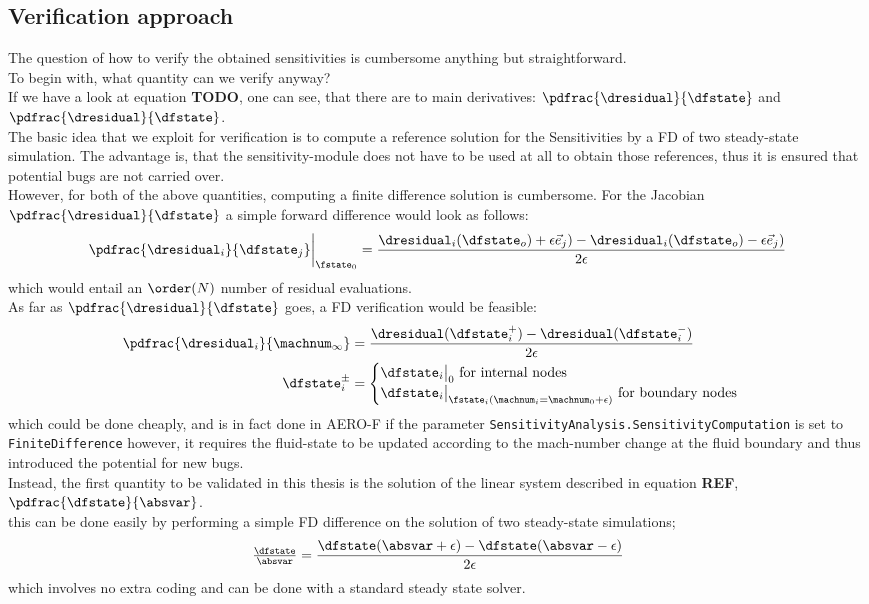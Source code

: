 \documentclass[../main.tex]{subfiles}
\begin{document}
\subsection{Verification approach}\label{sec:verification_approach}
The question of how to verify the obtained sensitivities is cumbersome anything but straightforward.\\
To begin with, what quantity can we verify anyway?\\
If we have a look at equation \textbf{TODO}, one can see, that there are to main derivatives: $\pdfrac{\dresidual}{\dfstate}$ and $\pdfrac{\dresidual}{\dfstate}$.\\
The basic idea that we exploit for verification is to compute a reference solution for the Sensitivities by a \ac{FD} of two steady-state simulation. The advantage is, that the sensitivity-module does not have to be used at all to obtain those references, thus it is ensured that potential bugs are not carried over.\\
However, for both of the above quantities, computing a finite difference solution is cumbersome. For the Jacobian $\pdfrac{\dresidual}{\dfstate}$ a simple forward difference would look as follows:
\begin{align}
\pdfrac{\dresidual_i}{\dfstate_j}\bigg\rvert_{\fstate_0}=\frac{\dresidual_i(\dfstate_o)+\epsilon\vec{e}_j)-\dresidual_i(\dfstate_o)-\epsilon\vec{e}_j)}{2\epsilon}
\end{align}
which would entail an $\order(N)$ number of residual evaluations.\\
As far as $\pdfrac{\dresidual}{\dfstate}$ goes, a \ac{FD} verification would be feasible:
\begin{align}
\pdfrac{\dresidual_i}{\machnum_{\infty}}&=\frac{\dresidual(\dfstate_i^{+})-\dresidual(\dfstate_i^{-})}{2\epsilon} \nonumber \\
\dfstate_i^{\pm} &=
\begin{cases}
\dfstate_i\big\rvert_{0}\text{   for internal nodes}\\
\dfstate_i\big\rvert_{\fstate_i(\machnum_i=\machnum_0+\epsilon)}\text{   for boundary nodes}
\end{cases}
\end{align}
which could be done cheaply, and is in fact done in AERO-F if the parameter \texttt{SensitivityAnalysis.SensitivityComputation} is set to \texttt{FiniteDifference} however, it requires the fluid-state to be updated according to the mach-number change at the fluid boundary and thus introduced the potential for new bugs.\\
Instead, the first quantity to be validated in this thesis is the solution of the linear system described in equation \textbf{REF}, $\pdfrac{\dfstate}{\absvar}$.\\
this can be done easily by performing a simple \ac{FD} difference on the solution of two steady-state simulations;
\begin{align}
\tfrac{\dfstate}{\absvar}=\frac{\dfstate(\absvar+\epsilon)-\dfstate(\absvar-\epsilon)}{2 \epsilon}
\end{align}
which involves no extra coding and can be done with a standard steady state solver.\\
\end{document}
